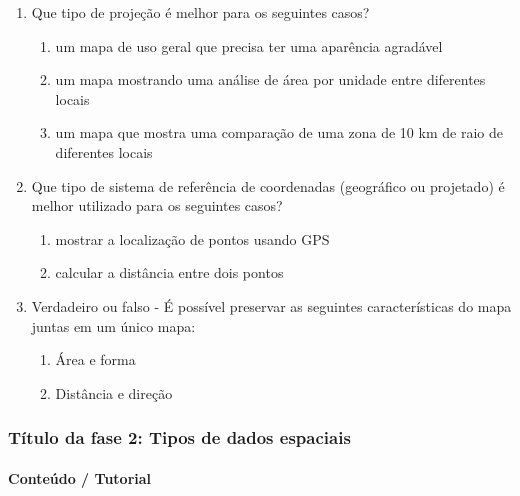 \documentclass[
]{book}
\providecommand{\tightlist}{%
  \setlength{\itemsep}{0pt}\setlength{\parskip}{0pt}}
\theoremstyle{definition}
\theoremstyle{definition}
\theoremstyle{definition}
\theoremstyle{definition}
\theoremstyle{remark}
\begin{document}
\begin{enumerate}
\def\labelenumi{\arabic{enumi}.}
\tightlist
\item
  Que tipo de projeção é melhor para os seguintes casos?

  \begin{enumerate}
  \def\labelenumii{\arabic{enumii}.}
  \tightlist
  \item
    um mapa de uso geral que precisa ter uma aparência agradável
  \item
    um mapa mostrando uma análise de área por unidade entre diferentes locais
  \item
    um mapa que mostra uma comparação de uma zona de 10 km de raio de diferentes locais
  \end{enumerate}
\item
  Que tipo de sistema de referência de coordenadas (geográfico ou projetado) é melhor utilizado para os seguintes casos?

  \begin{enumerate}
  \def\labelenumii{\arabic{enumii}.}
  \setcounter{enumii}{3}
  \tightlist
  \item
    mostrar a localização de pontos usando GPS
  \item
    calcular a distância entre dois pontos
  \end{enumerate}
\item
  Verdadeiro ou falso - É possível preservar as seguintes características do mapa juntas em um único mapa:

  \begin{enumerate}
  \def\labelenumii{\arabic{enumii}.}
  \setcounter{enumii}{5}
  \tightlist
  \item
    Área e forma
  \item
    Distância e direção
  \end{enumerate}
\end{enumerate}

\hypertarget{tuxedtulo-da-fase-2-tipos-de-dados-espaciais}{%
\subsubsection{Título da fase 2: Tipos de dados espaciais}\label{tuxedtulo-da-fase-2-tipos-de-dados-espaciais}}

\hypertarget{conteuxfado-tutorial-1}{%
\paragraph{Conteúdo / Tutorial}\label{conteuxfado-tutorial-1}}
\end{document}
